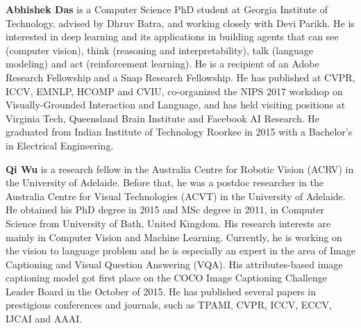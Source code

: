 {\bfseries Abhishek Das} is a Computer Science PhD student
at Georgia Institute of Technology, advised
by Dhruv Batra, and working closely with Devi
Parikh. He is interested in deep learning and its
applications in building agents that can see (computer
vision), think (reasoning and interpretability),
talk (language modeling) and act (reinforcement
learning). He is a recipient of an Adobe Research
Fellowship and a Snap Research Fellowship.
He has published at CVPR, ICCV, EMNLP,
HCOMP and CVIU, co-organized the NIPS 2017
workshop on Visually-Grounded Interaction and
Language, and has held visiting positions at Virginia
Tech, Queensland Brain Institute and Facebook
AI Research. He graduated from Indian
Institute of Technology Roorkee in 2015 with a
Bachelor’s in Electrical Engineering.

{\bfseries Qi Wu} is a research fellow in the Australia
Centre for Robotic Vision (ACRV) in the University
of Adelaide. Before that, he was a postdoc
researcher in the Australia Centre for Visual Technologies
(ACVT) in the University of Adelaide.
He obtained his PhD degree in 2015 and MSc degree
in 2011, in Computer Science from University
of Bath, United Kingdom. His research interests
are mainly in Computer Vision and Machine
Learning. Currently, he is working on the vision to
language problem and he is especially an expert
in the area of Image Captioning and Visual Question
Answering (VQA). His attributes-based image
captioning model got first place on the COCO
Image Captioning Challenge Leader Board in the
October of 2015. He has published several papers
in prestigious conferences and journals, such as
TPAMI, CVPR, ICCV, ECCV, IJCAI and AAAI.


